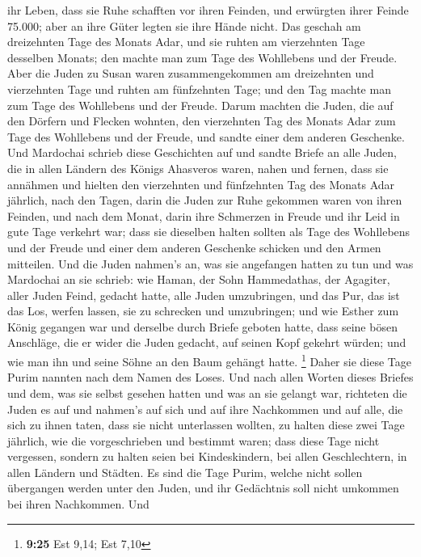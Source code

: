 ihr Leben, dass sie Ruhe schafften vor ihren Feinden, und erwürgten
ihrer Feinde 75.000; aber an ihre Güter legten sie ihre Hände nicht.
 Das geschah am dreizehnten Tage des Monats Adar, und sie
ruhten am vierzehnten Tage desselben Monats; den machte man zum Tage des
Wohllebens und der Freude.  Aber die Juden zu Susan waren
zusammengekommen am dreizehnten und vierzehnten Tage und ruhten am
fünfzehnten Tage; und den Tag machte man zum Tage des Wohllebens und der
Freude.  Darum machten die Juden, die auf den Dörfern und
Flecken wohnten, den vierzehnten Tag des Monats Adar zum Tage des
Wohllebens und der Freude, und sandte einer dem anderen Geschenke.
 Und Mardochai schrieb diese Geschichten auf und sandte
Briefe an alle Juden, die in allen Ländern des Königs Ahasveros waren,
nahen und fernen,  dass sie annähmen und hielten den
vierzehnten und fünfzehnten Tag des Monats Adar jährlich,
 nach den Tagen, darin die Juden zur Ruhe gekommen waren
von ihren Feinden, und nach dem Monat, darin ihre Schmerzen in Freude
und ihr Leid in gute Tage verkehrt war; dass sie dieselben halten
sollten als Tage des Wohllebens und der Freude und einer dem anderen
Geschenke schicken und den Armen mitteilen.  Und die
Juden nahmen's an, was sie angefangen hatten zu tun und was Mardochai an
sie schrieb:  wie Haman, der Sohn Hammedathas, der
Agagiter, aller Juden Feind, gedacht hatte, alle Juden umzubringen, und
das Pur, das ist das Los, werfen lassen, sie zu schrecken und
umzubringen;  und wie Esther zum König gegangen war und
derselbe durch Briefe geboten hatte, dass seine bösen Anschläge, die er
wider die Juden gedacht, auf seinen Kopf gekehrt würden; und wie man ihn
und seine Söhne an den Baum gehängt hatte. \footnote{\textbf{9:25} Est
  9,14; Est 7,10}  Daher sie diese Tage Purim nannten
nach dem Namen des Loses. Und nach allen Worten dieses Briefes und dem,
was sie selbst gesehen hatten und was an sie gelangt war,
 richteten die Juden es auf und nahmen's auf sich und auf
ihre Nachkommen und auf alle, die sich zu ihnen taten, dass sie nicht
unterlassen wollten, zu halten diese zwei Tage jährlich, wie die
vorgeschrieben und bestimmt waren;  dass diese Tage nicht
vergessen, sondern zu halten seien bei Kindeskindern, bei allen
Geschlechtern, in allen Ländern und Städten. Es sind die Tage Purim,
welche nicht sollen übergangen werden unter den Juden, und ihr
Gedächtnis soll nicht umkommen bei ihren Nachkommen.  Und
